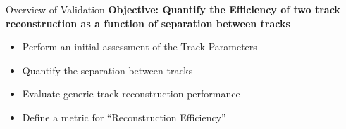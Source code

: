 \begin{frame}{Overview of Validation }
    \textbf{Objective: Quantify the Efficiency of  two track reconstruction  as a function of separation between tracks}
    \begin{itemize}
        \item Perform an initial assessment of the Track Parameters
        \item Quantify the separation between tracks
        \item Evaluate generic track reconstruction performance
        \item Define a metric for ``Reconstruction Efficiency'' 

        
    \end{itemize}

\end{frame}